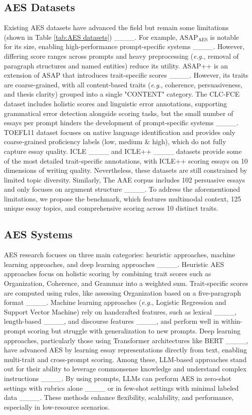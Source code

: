 \subsection{AES Datasets}
Existing AES datasets have advanced the field but remain some limitations (shown in Table \ref{tab:AES datasets}) ____. For example, $\text{ASAP}_{\text{AES}}$ is notable for its size, enabling high-performance prompt-specific systems ____. However, differing score ranges across prompts and heavy preprocessing (\textit{e.g.}, removal of paragraph structures and named entities) reduce its utility. ASAP++ is an extension of ASAP that introduces trait-specific scores ____. However, its traits are coarse-grained, with all content-based traits (\textit{e.g}., coherence, persuasiveness, and thesis clarity) grouped into a single "CONTENT" category. The CLC-FCE dataset includes holistic scores and linguistic error annotations, supporting grammatical error detection alongside scoring tasks, but the small number of essays per prompt hinders the development of prompt-specific systems ____. TOEFL11 dataset focuses on native language identification and provides only coarse-grained proficiency labels (low, medium \& high), which do not fully capture essay quality. ICLE ____ and ICLE++ ____ datasets provide some of the most detailed trait-specific annotations, with ICLE++ scoring essays on 10 dimensions of writing quality. Nevertheless, these datasets are still constrained by limited topic diversity. Similarly, The AAE corpus includes 102 persuasive essays and only focuses on argument structure ____. To address the aforementioned limitations, we propose the \dataset benchmark, which features multimodal context, 125 unique essay topics, and comprehensive scoring across 10 distinct traits.



\subsection{AES Systems}
AES research focuses on three main categories: heuristic approaches, machine learning approaches, and deep learning approaches ____. Heuristic AES approaches focus on holistic scoring by combining trait scores such as Organization, Coherence, and Grammar into a weighted sum. Trait-specific scores are computed using rules, like assessing Organization based on a five-paragraph format ____. Machine learning approaches (\textit{e.g.}, Logistic Regression and Support Vector Machine) rely on handcrafted features, such as lexical ____, length-based ____, and discourse features ____, and perform well in within-prompt scoring but struggle with generalization to new prompts. Deep learning approaches, particularly those using Transformer architectures like BERT ____, have advanced AES by learning essay representations directly from text, enabling multi-trait and cross-prompt scoring. Among these, LLM-based approaches stand out for their ability to leverage commonsense knowledge and understand complex instructions ____. By using prompts, LLMs can perform AES in zero-shot settings with rubrics alone ____ or in few-shot settings with minimal labeled data ____. These methods enhance flexibility, scalability, and performance, especially in low-resource scenarios.

